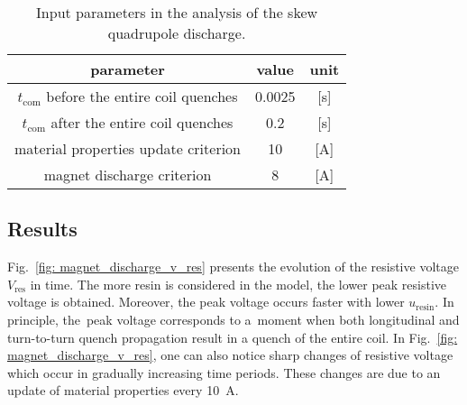 \begin{table}[H]
    \caption{Input parameters in the analysis of the skew quadrupole discharge.} 
    \vspace{-1.em} 
    \fontsize{10}{10}
    \selectfont 
    \renewcommand{\arraystretch}{1.5}
    \begin{center}
        \begin{tabular}{ ccc }  
        \hline
        parameter & value & unit \\
        \hline
        $t_\text{com}$ before the entire coil quenches & 0.0025 & [s] \\
        $t_\text{com}$ after the entire coil quenches & 0.2 & [s] \\ 
        material properties update criterion & 10 & [A] \\ 
        magnet discharge criterion & 8 & [A] \\
        \hline 
        \end{tabular}
    \end{center}  
     \label{table: skew_quad_discharge_input_params} 
 \end{table}

\subsection{Results}

Fig.~\ref{fig: magnet_discharge_v_res} presents the evolution of the resistive voltage $V_\text{res}$ in time. The more resin is considered in the model, the lower peak resistive voltage is obtained. Moreover, the peak voltage occurs faster with lower $u_\text{resin}$. In principle, the~peak voltage corresponds to a~moment when both longitudinal and turn-to-turn quench propagation result in a quench of the entire coil. In Fig.~\ref{fig: magnet_discharge_v_res}, one can also notice sharp changes of resistive voltage which occur in gradually increasing time periods. These changes are due to an update of material properties every 10~A.

